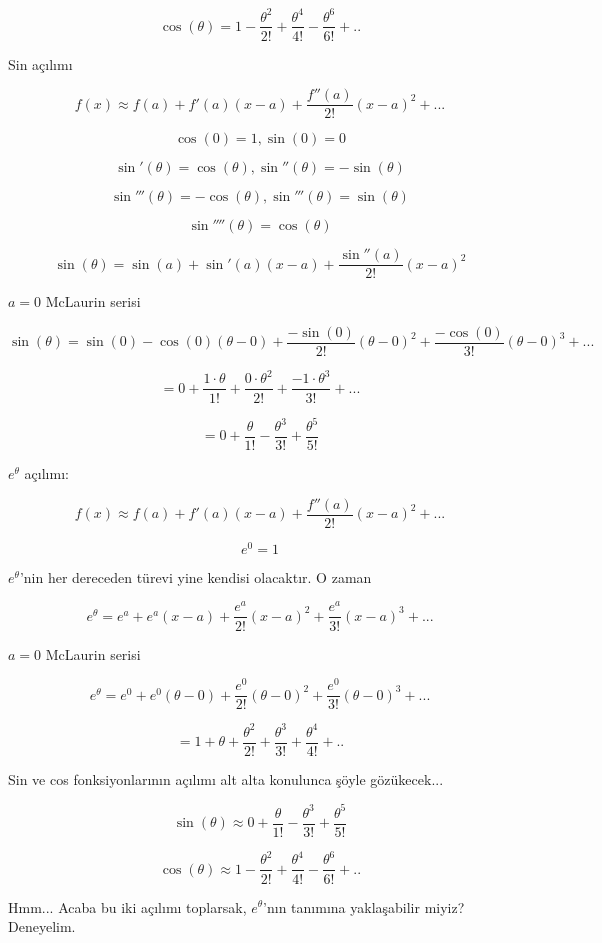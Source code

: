 \documentclass[12pt,fleqn]{article}\usepackage{../../common}
\begin{document}
$$ \cos(\theta) =
1-\frac{\theta^2}{2!}+\frac{\theta^4}{4!}-\frac{\theta^6}{6!} + ..$$

Sin açılımı

$$ f(x) \approx f(a) + f'(a)(x-a) + \frac{f''(a)}{2!}(x-a)^2 + ...$$

$$ \cos(0) = 1, \sin(0) = 0 $$

$$ \sin'(\theta) = \cos(\theta), \sin''(\theta) = -\sin(\theta) $$

$$ \sin'''(\theta) = -\cos(\theta), \sin'''(\theta) = \sin(\theta) $$

$$ \sin''''(\theta) = \cos(\theta) $$

$$ \sin(\theta) = \sin(a) + \sin'(a)(x-a) + \frac{\sin''(a)}{2!}(x-a)^2 $$

$a = 0$ McLaurin serisi

$$ \sin(\theta) = \sin(0) - \cos(0)(\theta-0) + \frac{-\sin(0)}{2!}(\theta-0)^2 +
\frac{-\cos(0)}{3!}(\theta-0)^3 + ...
 $$

$$ = 0 + \frac{1 \cdot \theta}{1!} + \frac{0 \cdot \theta^2}{2!} + \frac{-1
\cdot \theta^3}{3!} + ...$$

$$ = 0 + \frac{\theta}{1!} - \frac{\theta^3}{3!} + \frac{\theta^5}{5!}$$

$e^{\theta}$ açılımı: 

$$ f(x) \approx f(a) + f'(a)(x-a) + \frac{f''(a)}{2!}(x-a)^2 + ...$$

$$ e^0 = 1 $$

$e^\theta$'nin her dereceden türevi yine kendisi olacaktır. O zaman

$$ e^{\theta} = e^{a} + e^{a}(x-a) + \frac{e^{a}}{2!}(x-a)^2 +
\frac{e^{a}}{3!}(x-a)^3 + ...    $$

$a = 0$ McLaurin serisi

$$ e^{\theta} = e^{0} + e^{0}(\theta-0) + \frac{e^{0}}{2!}(\theta-0)^2 +
\frac{e^{0}}{3!}(\theta-0)^3 + ... $$

$$ = 1 + \theta + \frac{\theta^2}{2!} + \frac{\theta^3}{3!} +
\frac{\theta^4}{4!} + .. $$

Sin ve cos fonksiyonlarının açılımı alt alta konulunca şöyle gözükecek...

$$ \sin(\theta) \approx 0 + \frac{\theta}{1!} - \frac{\theta^3}{3!} + \frac{\theta^5}{5!}$$

$$ \cos(\theta) \approx
1-\frac{\theta^2}{2!}+\frac{\theta^4}{4!}-\frac{\theta^6}{6!} + ..$$

Hmm... Acaba bu iki açılımı toplarsak, $e^\theta$'nın tanımına yaklaşabilir
miyiz? Deneyelim.
\end{document}
